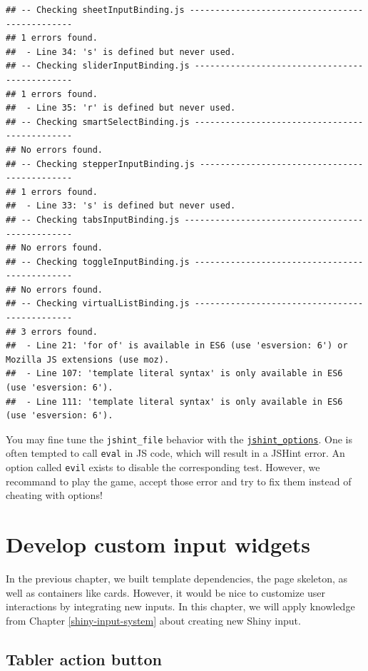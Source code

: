 \documentclass[
]{book}
\begin{document}
\begin{verbatim}
## -- Checking sheetInputBinding.js ----------------------------------------------- 
## 1 errors found. 
##  - Line 34: 's' is defined but never used. 
## -- Checking sliderInputBinding.js ---------------------------------------------- 
## 1 errors found. 
##  - Line 35: 'r' is defined but never used. 
## -- Checking smartSelectBinding.js ---------------------------------------------- 
## No errors found. 
## -- Checking stepperInputBinding.js --------------------------------------------- 
## 1 errors found. 
##  - Line 33: 's' is defined but never used. 
## -- Checking tabsInputBinding.js ------------------------------------------------ 
## No errors found. 
## -- Checking toggleInputBinding.js ---------------------------------------------- 
## No errors found. 
## -- Checking virtualListBinding.js ---------------------------------------------- 
## 3 errors found. 
##  - Line 21: 'for of' is available in ES6 (use 'esversion: 6') or Mozilla JS extensions (use moz). 
##  - Line 107: 'template literal syntax' is only available in ES6 (use 'esversion: 6'). 
##  - Line 111: 'template literal syntax' is only available in ES6 (use 'esversion: 6').
\end{verbatim}

You may fine tune the \texttt{jshint\_file} behavior with the \href{https://jshint.com/docs/options/}{\texttt{jshint\_options}}. One is often tempted to call \texttt{eval} in JS code, which will result in a JSHint error. An option called \texttt{evil} exists to disable the corresponding test. However, we recommand to play the game, accept those error and try to fix them instead of cheating with options!

\hypertarget{custom-templates-inputs}{%
\chapter{Develop custom input widgets}\label{custom-templates-inputs}}

In the previous chapter, we built template dependencies, the page skeleton, as well as containers like cards. However, it would be nice to customize user interactions by integrating new inputs. In this chapter, we will apply knowledge from Chapter \ref{shiny-input-system} about creating new Shiny input.

\hypertarget{tabler-action-button}{%
\section{Tabler action button}\label{tabler-action-button}}
\end{document}
